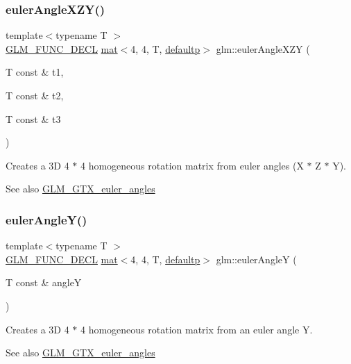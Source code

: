 \subsubsection{\texorpdfstring{euler\+Angle\+X\+Z\+Y()}{eulerAngleXZY()}}
{\footnotesize\ttfamily template$<$typename T $>$ \\
\hyperlink{setup_8hpp_ab2d052de21a70539923e9bcbf6e83a51}{G\+L\+M\+\_\+\+F\+U\+N\+C\+\_\+\+D\+E\+CL} \hyperlink{structglm_1_1mat}{mat}$<$4, 4, T, \hyperlink{namespaceglm_a36ed105b07c7746804d7fdc7cc90ff25a9d21ccd8b5a009ec7eb7677befc3bf51}{defaultp}$>$ glm\+::euler\+Angle\+X\+ZY (\begin{DoxyParamCaption}\item[{T const \&}]{t1,  }\item[{T const \&}]{t2,  }\item[{T const \&}]{t3 }\end{DoxyParamCaption})}

Creates a 3D 4 $\ast$ 4 homogeneous rotation matrix from euler angles (X $\ast$ Z $\ast$ Y). \begin{DoxySeeAlso}{See also}
\hyperlink{group__gtx__euler__angles}{G\+L\+M\+\_\+\+G\+T\+X\+\_\+euler\+\_\+angles} 
\end{DoxySeeAlso}
\mbox{\label{group__gtx__euler__angles_gab84bf4746805fd69b8ecbb230e3974c5}} 
\subsubsection{\texorpdfstring{euler\+Angle\+Y()}{eulerAngleY()}}
{\footnotesize\ttfamily template$<$typename T $>$ \\
\hyperlink{setup_8hpp_ab2d052de21a70539923e9bcbf6e83a51}{G\+L\+M\+\_\+\+F\+U\+N\+C\+\_\+\+D\+E\+CL} \hyperlink{structglm_1_1mat}{mat}$<$4, 4, T, \hyperlink{namespaceglm_a36ed105b07c7746804d7fdc7cc90ff25a9d21ccd8b5a009ec7eb7677befc3bf51}{defaultp}$>$ glm\+::euler\+AngleY (\begin{DoxyParamCaption}\item[{T const \&}]{angleY }\end{DoxyParamCaption})}

Creates a 3D 4 $\ast$ 4 homogeneous rotation matrix from an euler angle Y. \begin{DoxySeeAlso}{See also}
\hyperlink{group__gtx__euler__angles}{G\+L\+M\+\_\+\+G\+T\+X\+\_\+euler\+\_\+angles} 
\end{DoxySeeAlso}
\mbox{\label{group__gtx__euler__angles_ga4f57e6dd25c3cffbbd4daa6ef3f4486d}} 
